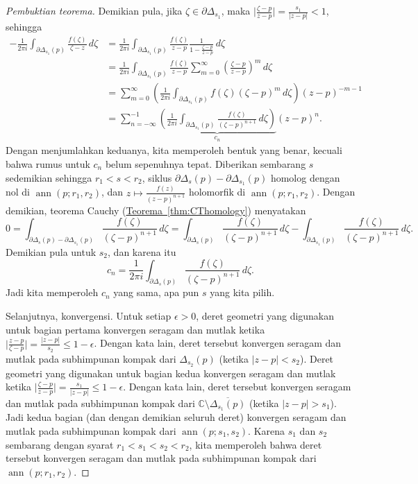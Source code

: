 \documentclass[12pt,openany]{book}
\newcommand{\ann}{\operatorname{ann}}
\newcommand{\sabs}[1]{\lvert {#1} \rvert}
\newcommand{\babs}[1]{\bigl\lvert {#1} \bigr\rvert}
\newcommand{\C}{{\mathbb{C}}}
\theoremstyle{plain}
\theoremstyle{remark}
\theoremstyle{definition}
\theoremstyle{exercise}
\theoremstyle{example}
\newcommand{\thmref}[1]{\hyperref[#1]{Teorema~\ref*{#1}}}
\begin{document}
\begin{proof}[Pembuktian teorema]
Demikian pula, 
jika $\zeta \in \partial \Delta_{s_1}$, maka
$\babs{\frac{\zeta-p}{z-p}} = \frac{s_1}{\sabs{z-p}} < 1$, sehingga
\begin{equation*}
\begin{split}
-\frac{1}{2\pi i}
\int_{\partial \Delta_{s_1}(p)} \frac{f(\zeta)}{\zeta-z} \, d\zeta 
& = 
\frac{1}{2\pi i}
\int_{\partial \Delta_{s_1}(p)} \frac{f(\zeta)}{z-p}
\frac{1}{1-\frac{\zeta-p}{z-p}} \, d\zeta
\\
& =
\frac{1}{2\pi i}
\int_{\partial \Delta_{s_1}(p)} \frac{f(\zeta)}{z-p}
\sum_{m=0}^\infty
{\left(\frac{\zeta-p}{z-p}\right)}^m \, d\zeta
\\
& =
\sum_{m=0}^\infty
\left(
\frac{1}{2\pi i}
\int_{\partial \Delta_{s_1}(p)} f(\zeta){(\zeta-p)}^{m}
 \, d\zeta
\right)
{(z-p)}^{-m-1}
\\
& =
\sum_{n=-\infty}^{-1}
\underbrace{
\left(
\frac{1}{2\pi i}
\int_{\partial \Delta_{s_1}(p)} \frac{f(\zeta)}{{(\zeta-p)}^{n+1}}
 \, d\zeta
\right)
}_{c_n}
{(z-p)}^{n} .
\end{split}
\end{equation*}
Dengan menjumlahkan keduanya, kita memperoleh bentuk yang benar, kecuali bahwa rumus untuk $c_n$
belum sepenuhnya tepat. Diberikan sembarang $s$ sedemikian sehingga
$r_1 < s < r_2$,
siklus
$\partial \Delta_{s}(p) - \partial \Delta_{s_1}(p)$ homolog dengan nol di
$\ann(p;r_1,r_2)$, dan 
$z \mapsto \frac{f(z)}{{(z-p)}^{n+1}}$ holomorfik di 
$\ann(p;r_1,r_2)$. Dengan demikian, teorema Cauchy (\thmref{thm:CThomology}) menyatakan
\begin{equation*}
0 = \int_{\partial \Delta_{s}(p) - \partial \Delta_{s_1}(p)}
\frac{f(\zeta)}{{(\zeta-p)}^{n+1}} \, d\zeta
=
\int_{\partial \Delta_{s}(p)}
\frac{f(\zeta)}{{(\zeta-p)}^{n+1}} \, d\zeta
-
\int_{\partial \Delta_{s_1}(p)}
\frac{f(\zeta)}{{(\zeta-p)}^{n+1}} \, d\zeta .
\end{equation*}
Demikian pula untuk $s_2$, dan karena itu
\begin{equation*}
c_n = \frac{1}{2\pi i}
\int_{\partial \Delta_{s}(p)} \frac{f(\zeta)}{{(\zeta-p)}^{n+1}}
 \, d\zeta .
\end{equation*}
Jadi kita memperoleh $c_n$ yang sama, apa pun $s$ yang kita pilih.

Selanjutnya, konvergensi.
Untuk setiap $\epsilon > 0$,
deret geometri yang digunakan untuk bagian pertama konvergen seragam
dan mutlak ketika $\babs{\frac{z-p}{\zeta-p}} = \frac{\sabs{z-p}}{s_2} \leq
1-\epsilon$. Dengan kata lain, deret tersebut konvergen seragam dan mutlak
pada subhimpunan kompak dari $\Delta_{s_2}(p)$ (ketika $\sabs{z-p} < s_2$).
%
Deret geometri yang digunakan untuk bagian kedua konvergen seragam
dan mutlak ketika $\babs{\frac{\zeta-p}{z-p}} = \frac{s_1}{\sabs{z-p}} \leq
1-\epsilon$. Dengan kata lain, deret tersebut konvergen seragam dan mutlak
pada subhimpunan kompak dari $\C \setminus \overline{\Delta_{s_1}(p)}$
(ketika $\sabs{z-p} > s_1$).
Jadi kedua bagian (dan dengan demikian seluruh deret) 
konvergen seragam dan mutlak pada subhimpunan kompak
dari $\ann(p;s_1,s_2)$. Karena $s_1$ dan $s_2$ sembarang dengan syarat
$r_1 < s_1 < s_2 < r_2$, kita memperoleh bahwa deret tersebut
konvergen seragam dan mutlak pada subhimpunan kompak dari $\ann(p;r_1,r_2)$.


\end{proof}
\end{document}
